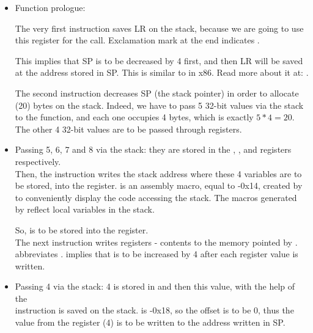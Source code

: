 \begin{itemize}
\item Function prologue:

The very first  instruction saves \ac{LR} on the stack, because we are going to use this register for the \printf call.
Exclamation mark at the end indicates .

This implies that \ac{SP} is to be decreased by 4 first, and then \ac{LR} will be saved at the address stored in \ac{SP}.
This is similar to \PUSH in x86.
Read more about it at: .

The second  instruction decreases \ac{SP} (the \gls{stack pointer}) in order to allocate  (20) bytes on the stack.
Indeed, we have to pass 5 32-bit values via the stack to the \printf function, and each one occupies 4 bytes, which is exactly $5*4=20$.
The other 4 32-bit values are to be passed through registers.

\item Passing 5, 6, 7 and 8 via the stack: they are stored in the , ,  and  registers respectively.\\
Then, the  instruction writes the stack address where these 4 variables are to be stored, into the  register.
 is an assembly macro, equal to -0x14, created by \IDA to conveniently display the code accessing the stack.
The  macros generated by \IDA reflect local variables in the stack.

So,  is to be stored into the  register. \\
The next  instruction writes registers - contents to the memory pointed by .
 abbreviates . 
 implies that  is to be increased by 4 after each register value is written.

\item Passing 4 via the stack: 4 is stored in  and then this value, with the help of the \\
 instruction is saved on the stack.
 is -0x18, so the offset is to be 0, thus the value from the  register (4) is to be written to the address written in \ac{SP}.


\end{itemize}
